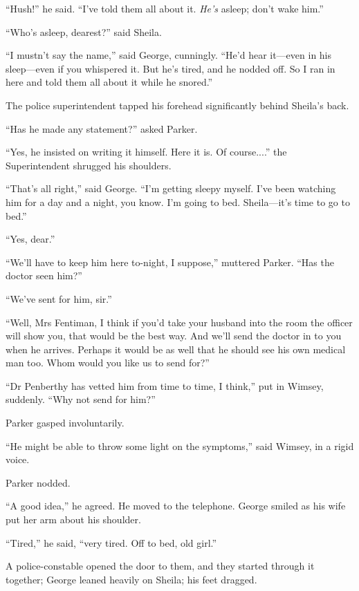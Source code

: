 \enquote{Hush!} he said. \enquote{I've told them all about it. \textit{He's} asleep; don't wake him.}

\enquote{Who's asleep, dearest?} said Sheila.

\enquote{I mustn't say the name,} said George, cunningly. \enquote{He'd hear it\allowbreak---\allowbreak even in his sleep\allowbreak---\allowbreak even if you whispered it. But he's tired, and he nodded off. So I ran in here and told them all about it while he snored.}

The police superintendent tapped his forehead significantly behind Sheila's back.

\enquote{Has he made any statement?} asked Parker.

\enquote{Yes, he insisted on writing it himself. Here it is. Of course....} the Superintendent shrugged his shoulders.

\enquote{That's all right,} said George. \enquote{I'm getting sleepy myself. I've been watching him for a day and a night, you know. I'm going to bed. Sheila\allowbreak---\allowbreak it's time to go to bed.}

\enquote{Yes, dear.}

\enquote{We'll have to keep him here to-night, I suppose,} muttered Parker. \enquote{Has the doctor seen him?}

\enquote{We've sent for him, sir.}

\enquote{Well, Mrs Fentiman, I think if you'd take your husband into the room the officer will show you, that would be the best way. And we'll send the doctor in to you when he arrives. Perhaps it would be as well that he should see his own medical man too. Whom would you like us to send for?}

\enquote{Dr Penberthy has vetted him from time to time, I think,} put in Wimsey, suddenly. \enquote{Why not send for him?}

Parker gasped involuntarily.

\enquote{He might be able to throw some light on the symptoms,} said Wimsey, in a rigid voice.

Parker nodded.

\enquote{A good idea,} he agreed. He moved to the telephone. George smiled as his wife put her arm about his shoulder.

\enquote{Tired,} he said, \enquote{very tired. Off to bed, old girl.}

A police-constable opened the door to them, and they started through it together; George leaned heavily on Sheila; his feet dragged.

